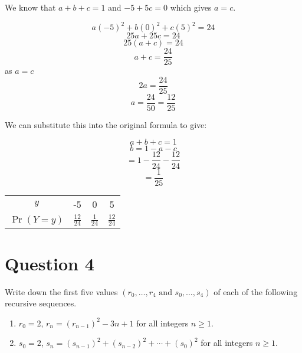 \documentclass[11pt]{article}
\begin{document}
We know that $a + b + c = 1$ and $-5 + 5c = 0$ which gives $a = c$.

\[ a{(-5)}^2 + b{(0)}^2 + c{(5)}^2 = 24 \]
\[ 25a + 25c = 24 \]
\[ 25(a + c) = 24 \]
\[ a + c = \frac{24}{25} \]
as $a = c$ \[ 2a = \frac{24}{25} \]
\[ a = \frac{24}{50} = \frac{12}{25} \]

We can substitute this into the original formula to give:

\[ a + b + c = 1 \]
\[ b = 1 - a - c \]
\[ = 1 - \frac{12}{24} - \frac{12}{24} \]
\[ = \frac{1}{25} \]

\begin{center}
  \begin{tabular}{c c c c}
    \toprule
    $y$ & -5 & 0 & 5 \\
    $\Pr(Y=y)$ & $\frac{12}{24}$ & $\frac{1}{24}$ & $\frac{12}{24}$ \\
    \bottomrule
  \end{tabular}
\end{center}

\break{}
\section*{Question 4}

Write down the first five values $(r_0, \dots, r_4 \text{ and } s_0, \dots,
s_4)$ of each of the following recursive sequences.

\begin{enumerate}[label = (\alph*)]
  \item $r_0 = 2$, $r_n = {(r_{n-1})}^2 - 3n + 1$ for all integers $n \geq 1$.

  \item $s_0 = 2$, $s_n = {(s_{n-1})}^2 + {(s_{n-2})}^2 + \cdots + {(s_0)}^2$
  for all integers $n \geq 1$.

\end{enumerate}
\end{document}

